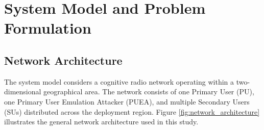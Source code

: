 

\chapter{System Model and Problem Formulation}

\section{\texorpdfstring{\large\textbf{Network Architecture}}{Network Architecture}}

The system model considers a cognitive radio network operating within a two-dimensional geographical area. The network consists of one Primary User (PU), one Primary User Emulation Attacker (PUEA), and multiple Secondary Users (SUs) distributed across the deployment region. Figure \ref{fig:network_architecture} illustrates the general network architecture used in this study.

